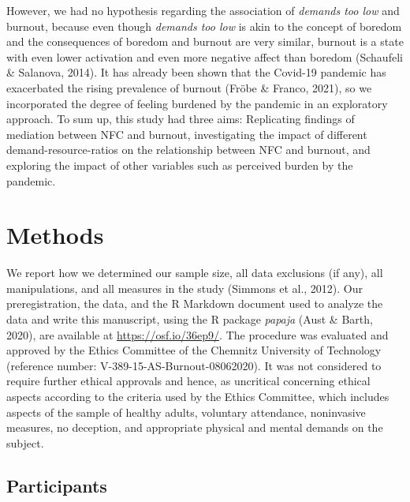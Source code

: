 \documentclass[
  english,
  man,floatsintext]{apa6}
\begin{document}
However, we had no hypothesis regarding the association of \emph{demands too low} and burnout, because even though \emph{demands too low} is akin to the concept of boredom and the consequences of boredom and burnout are very similar, burnout is a state with even lower activation and even more negative affect than boredom (Schaufeli \& Salanova, 2014).
It has already been shown that the Covid-19 pandemic has exacerbated the rising prevalence of burnout (Fröbe \& Franco, 2021), so we incorporated the degree of feeling burdened by the pandemic in an exploratory approach.
To sum up, this study had three aims: Replicating findings of mediation between NFC and burnout, investigating the impact of different demand-resource-ratios on the relationship between NFC and burnout, and exploring the impact of other variables such as perceived burden by the pandemic.

\hypertarget{methods}{%
\section{Methods}\label{methods}}

We report how we determined our sample size, all data exclusions (if any), all manipulations, and all measures in the study (Simmons et al., 2012).
Our preregistration, the data, and the R Markdown document used to analyze the data and write this manuscript, using the R package \emph{papaja} (Aust \& Barth, 2020), are available at \url{https://osf.io/36ep9/}.
The procedure was evaluated and approved by the Ethics Committee of the Chemnitz University of Technology (reference number: V-389-15-AS-Burnout-08062020).
It was not considered to require further ethical approvals and hence, as uncritical concerning ethical aspects according to the criteria used by the Ethics Committee, which includes aspects of the sample of healthy adults, voluntary attendance, noninvasive measures, no deception, and appropriate physical and mental demands on the subject.

\hypertarget{participants}{%
\subsection{Participants}\label{participants}}
\end{document}
